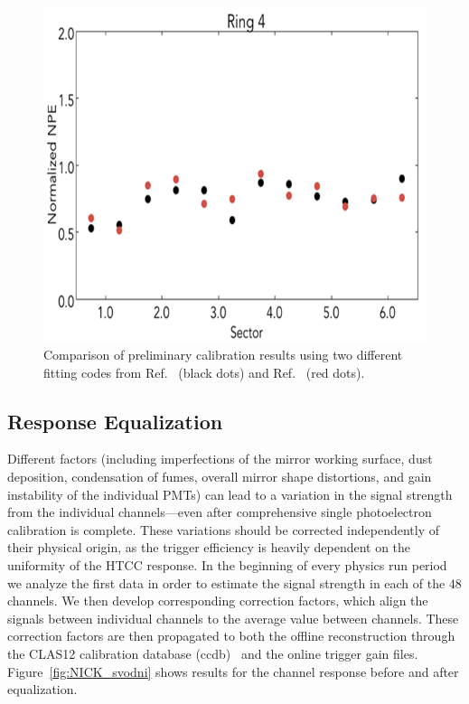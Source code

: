\begin{figure}[ht]
\centering
\includegraphics[width=0.99\linewidth]{images/WILLIAM_4.png}
\caption{Comparison of preliminary calibration results using two different fitting codes from
  Ref.~\cite{bellamy1996} (black dots) and Ref.~\cite{degtiarenko2017} (red dots).}
\label{fig:WILLIAM_4}
\end{figure}

\subsection{Response Equalization}

Different factors (including imperfections of the mirror working surface, dust deposition, condensation of fumes,
overall mirror shape distortions, and gain instability of the individual PMTs) can lead to a variation in the signal
strength from the individual channels---even after comprehensive single photoelectron calibration is complete.
These variations should be corrected independently of their physical origin, as the trigger efficiency is heavily
dependent on the uniformity of the HTCC response. In the beginning of every physics run period we analyze the
first data in order to estimate the signal strength in each of the 48 channels. We then develop corresponding
correction factors, which align the signals between individual channels to the average value between channels. These
correction factors are then propagated to both the offline reconstruction through the CLAS12 calibration database
(ccdb)~\cite{recon-nim} and the online trigger gain files. Figure~\ref{fig:NICK_svodni} shows results for the
channel response before and after equalization.

